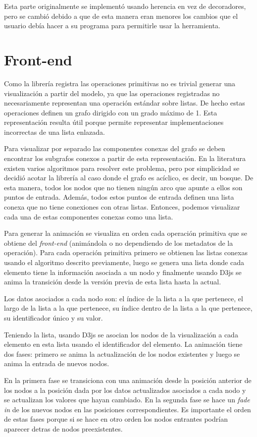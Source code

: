 Esta parte originalmente se implementó usando herencia en vez de decoradores, pero se cambió debido a que de esta manera eran menores los cambios que el usuario debía hacer a su programa para permitirle usar la herramienta.

\section{Front-end}

Como la librería registra las operaciones primitivas no es trivial generar una visualización a partir del modelo, ya que las operaciones registradas no necesariamente representan una operación estándar sobre listas. De hecho estas operaciones definen un grafo dirigido con un grado máximo de 1. Esta representación resulta útil porque permite representar implementaciones incorrectas de una lista enlazada.

Para visualizar por separado las componentes conexas del grafo se deben encontrar los subgrafos conexos a partir de esta representación. En la literatura existen varios algoritmos para resolver este problema, pero por simplicidad se decidió acotar la librería al caso donde el grafo es acíclico, es decir, un bosque. De esta manera, todos los nodos que no tienen ningún arco que apunte a ellos son puntos de entrada. Además, todos estos puntos de entrada definen una lista conexa que no tiene conexiones con otras listas. Entonces, podemos visualizar cada una de estas componentes conexas como una lista.

Para generar la animación se visualiza en orden cada operación primitiva que se obtiene del \textit{front-end} (animándola o no dependiendo de los metadatos de la operación). Para cada operación primitiva primero se obtienen las listas conexas usando el algoritmo descrito previamente, luego se genera una lista donde cada elemento tiene la información asociada a un nodo y finalmente usando D3js se anima la transición desde la versión previa de esta lista hasta la actual.

Los datos asociados a cada nodo son: el índice de la lista a la que pertenece, el largo de la lista a la que pertenece, su índice dentro de la lista a la que pertenece, su identificador único y su valor.

Teniendo la lista, usando D3js se asocian los nodos de la visualización a cada elemento en esta lista usando el identificador del elemento. La animación tiene dos fases: primero se anima la actualización de los nodos existentes y luego se anima la entrada de nuevos nodos.

En la primera fase se transiciona con una animación desde la posición anterior de los nodos a la posición dada por los datos actualizados asociados a cada nodo y se actualizan los valores que hayan cambiado. En la segunda fase se hace un \textit{fade in} de los nuevos nodos en las posiciones correspondientes. Es importante el orden de estas fases porque si se hace en otro orden los nodos entrantes podrían aparecer detras de nodos preexistentes.
